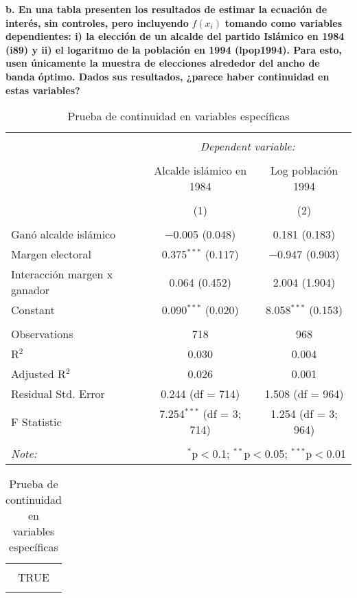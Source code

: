 \documentclass[
]{article}
\begin{document}
\newpage

\textbf{b. En una tabla presenten los resultados de estimar la ecuación
de interés, sin controles, pero incluyendo} \(f(x_i)\) \textbf{tomando
como variables dependientes: i) la elección de un alcalde del partido
Islámico en 1984 (i89) y ii) el logaritmo de la población en 1994
(lpop1994). Para esto, usen únicamente la muestra de elecciones
alrededor del ancho de banda óptimo. Dados sus resultados, ¿parece haber
continuidad en estas variables?}

\begin{table}[ht!] \centering 
  \caption{Prueba de continuidad en variables específicas} 
  \label{tab:continuidad_predeterminadas} 
\begin{tabular}{@{\extracolsep{5pt}}lcc} 
\\[-1.8ex]\hline 
\hline \\[-1.8ex] 
 & \multicolumn{2}{c}{\textit{Dependent variable:}} \\ 
\cline{2-3} 
\\[-1.8ex] & Alcalde islámico en 1984 & Log población 1994 \\ 
\\[-1.8ex] & (1) & (2)\\ 
\hline \\[-1.8ex] 
 Ganó alcalde islámico & $-$0.005 (0.048) & 0.181 (0.183) \\ 
  Margen electoral & 0.375$^{***}$ (0.117) & $-$0.947 (0.903) \\ 
  Interacción margen x ganador & 0.064 (0.452) & 2.004 (1.904) \\ 
  Constant & 0.090$^{***}$ (0.020) & 8.058$^{***}$ (0.153) \\ 
 \hline \\[-1.8ex] 
Observations & 718 & 968 \\ 
R$^{2}$ & 0.030 & 0.004 \\ 
Adjusted R$^{2}$ & 0.026 & 0.001 \\ 
Residual Std. Error & 0.244 (df = 714) & 1.508 (df = 964) \\ 
F Statistic & 7.254$^{***}$ (df = 3; 714) & 1.254 (df = 3; 964) \\ 
\hline 
\hline \\[-1.8ex] 
\textit{Note:}  & \multicolumn{2}{r}{$^{*}$p$<$0.1; $^{**}$p$<$0.05; $^{***}$p$<$0.01} \\ 
\end{tabular} 
\end{table}

\begin{table}[ht!] \centering 
  \caption{Prueba de continuidad en variables específicas} 
  \label{tab:continuidad_predeterminadas} 
\begin{tabular}{@{\extracolsep{5pt}} c} 
\\[-1.8ex]\hline 
\hline \\[-1.8ex] 
TRUE \\ 
\hline \\[-1.8ex] 
\end{tabular} 
\end{table}
\end{document}
